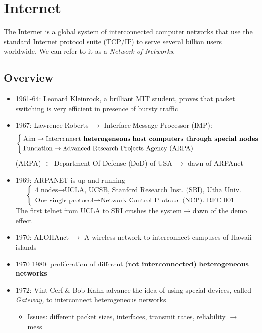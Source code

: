 \chapter{Internet}
The Internet is a global system of interconnected computer networks that use the standard Internet
protocol suite (TCP/IP) to serve several billion users worldwide. We can refer to it as a \textit{Network of Networks}.
\section{Overview}
\begin{itemize}
\item 1961-64: Leonard Kleinrock, a brilliant MIT student, proves that packet switching is very efficient in presence of bursty traffic
\item 1967: Lawrence Roberts $\rightarrow$ Interface Message Processor (IMP): 
\begin{equation}
\begin{cases}
\text{Aim} \rightarrow \text{Interconnect \textbf{heterogeneous host computers through special nodes}}\\
\text{Fundation} \rightarrow \text{Advanced Research Projects Agency (ARPA)}
\end{cases}
\end{equation}
(ARPA) $\in$ Department Of Defense (DoD) of USA $\rightarrow$ dawn of ARPAnet
\item 1969: ARPANET is up and running
\begin{equation}
\begin{cases}
\text{4 nodes}\rightarrow \text{UCLA, UCSB, Stanford Research Inst. (SRI), Utha Univ.}\\
\text{One single protocol} \rightarrow \text{Network Control Protocol (NCP): RFC 001} 
\end{cases}
\end{equation}
The first telnet from UCLA to SRI crashes the system$\rightarrow$dawn of the demo effect
\item 1970: ALOHAnet $\rightarrow$ A wireless network to interconnect campuses of Hawaii islands
\item 1970-1980: proliferation of different (\textbf{not interconnected) heterogeneous networks}
\item 1972: Vint Cerf $\&$ Bob Kahn advance the idea of using special devices, called \textit{Gateway,} to interconnect heterogeneous networks
\begin{itemize}
\item Issues: different packet sizes, interfaces, transmit rates, reliability $\rightarrow$ mess

\end{itemize}
\end{itemize}
